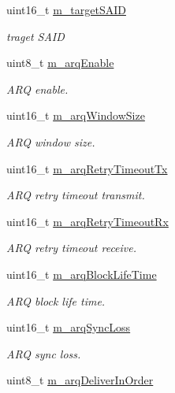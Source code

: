 \begin{DoxyCompactItemize}
uint16\+\_\+t \hyperlink{classns3_1_1ServiceFlow_a0155ea4031007c532c4a206561ec8835}{m\+\_\+target\+S\+A\+ID}
\begin{DoxyCompactList}\small\item\em traget S\+A\+ID \end{DoxyCompactList}\item 
uint8\+\_\+t \hyperlink{classns3_1_1ServiceFlow_abbea8cd5abb577970a936459f71f4c07}{m\+\_\+arq\+Enable}
\begin{DoxyCompactList}\small\item\em A\+RQ enable. \end{DoxyCompactList}\item 
uint16\+\_\+t \hyperlink{classns3_1_1ServiceFlow_ab160ff007191a43ea79a77d7da31d1cf}{m\+\_\+arq\+Window\+Size}
\begin{DoxyCompactList}\small\item\em A\+RQ window size. \end{DoxyCompactList}\item 
uint16\+\_\+t \hyperlink{classns3_1_1ServiceFlow_a4ec13b36ebe74498e5556ad162f001f0}{m\+\_\+arq\+Retry\+Timeout\+Tx}
\begin{DoxyCompactList}\small\item\em A\+RQ retry timeout transmit. \end{DoxyCompactList}\item 
uint16\+\_\+t \hyperlink{classns3_1_1ServiceFlow_acdaa53c3298bc50b58a06b30dabb33d2}{m\+\_\+arq\+Retry\+Timeout\+Rx}
\begin{DoxyCompactList}\small\item\em A\+RQ retry timeout receive. \end{DoxyCompactList}\item 
uint16\+\_\+t \hyperlink{classns3_1_1ServiceFlow_a3f7676dbb3c6ef4e0ac07c6be47e0a45}{m\+\_\+arq\+Block\+Life\+Time}
\begin{DoxyCompactList}\small\item\em A\+RQ block life time. \end{DoxyCompactList}\item 
uint16\+\_\+t \hyperlink{classns3_1_1ServiceFlow_a7a2d8589e71ab594cc962e9bc6192ef1}{m\+\_\+arq\+Sync\+Loss}
\begin{DoxyCompactList}\small\item\em A\+RQ sync loss. \end{DoxyCompactList}\item 
uint8\+\_\+t \hyperlink{classns3_1_1ServiceFlow_a63a1bcb8d446692d8ebec06d9119d6e2}{m\+\_\+arq\+Deliver\+In\+Order}

\end{DoxyCompactItemize}
